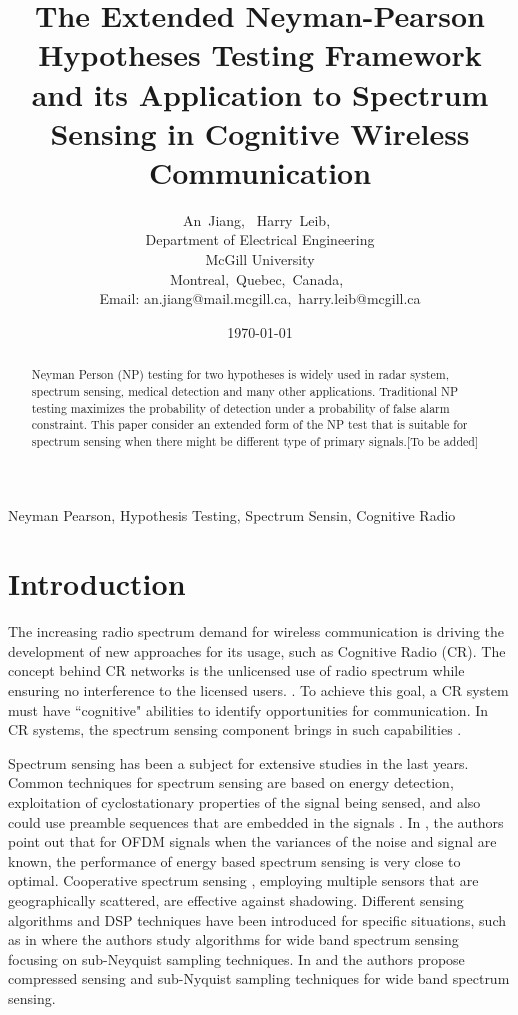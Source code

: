 \documentclass[12pt,journal,a4paper,twoside,onecolumn]{IEEEtran}
\author{An~Jiang,~
        Harry~Leib,~\\
          Department of Electrical Engineering\\
          McGill University\\
          Montreal,~Quebec,~Canada,~\\
          Email: an.jiang@mail.mcgill.ca,~harry.leib@mcgill.ca
}
\title{The Extended Neyman-Pearson Hypotheses Testing Framework and its Application to Spectrum Sensing in Cognitive Wireless Communication}
\date{\today}
\begin{document}
\begin{spacing}{2.5}
\maketitle
\begin{abstract}
Neyman Person (NP) testing for two hypotheses is widely used in radar system, spectrum sensing, medical detection and many other applications. Traditional NP testing maximizes the probability of detection under a probability of false alarm constraint. This paper consider an extended form of the NP test that is suitable for spectrum sensing when there might be different type of primary signals.[To be added]
\end{abstract}

\begin{IEEEkeywords}
Neyman Pearson, Hypothesis Testing, Spectrum Sensin, Cognitive Radio
\end{IEEEkeywords}

\section{Introduction}
The increasing radio spectrum demand for wireless communication is driving the development of new approaches for its usage, such as Cognitive Radio (CR)\cite{a001}. The concept behind CR networks is the unlicensed use of radio spectrum while ensuring no interference to the licensed users. \cite{goldsmith2009breaking}.
To achieve this goal, a CR system must have ``cognitive" abilities to identify opportunities for communication\cite{buddhikot2007understanding}. In CR systems, the spectrum sensing component brings in such capabilities \cite{tandra2009spectrum}.

 Spectrum sensing has been a subject for extensive studies in the last years\cite{axell2012spectrum}. Common techniques for spectrum sensing are based on energy detection, exploitation of cyclostationary properties of  the signal being sensed, and also could use preamble sequences that are embedded in the signals \cite{cabric2004implementation}.  In \cite{axell2011optimal}, the authors point out that for OFDM signals when the variances of the noise and signal are known, the performance of energy based spectrum sensing is very close to optimal. Cooperative spectrum sensing \cite{ganesan2005cooperative}, employing multiple sensors that are geographically scattered, are effective against shadowing.
Different sensing algorithms and DSP techniques have been introduced for specific situations, such as in \cite{tian2007compressed} where the authors study algorithms for wide band spectrum sensing focusing on sub-Neyquist sampling techniques. In  \cite{sun2013wideband} and  \cite{sun2013wideband2} the authors propose compressed sensing and sub-Nyquist sampling techniques for wide band spectrum sensing.


\end{spacing}
\end{document}
